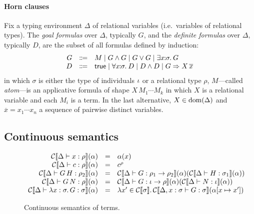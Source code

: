 \paragraph{Horn clauses}
Fix a typing environment $\Delta$ of relational variables (i.e.~variables of relational types). 
The \emph{goal formulas} over $\Delta$, typically $G$, and the \emph{definite formulas} over $\Delta$, typically $D$, are the subset of all formulas defined by induction:
\[
  \begin{array}{rcl}
    G & \Coloneqq & M \mid G \wedge G \mid G \vee G \mid \exists x\!\!:\!\!\sigma.\: G  \\
    D & \Coloneqq & \truetm \mid \forall x\!\!:\!\!\sigma.\: D \mid D \wedge D \mid G \Rightarrow X \, \overline x \\
  \end{array}
\]
in which $\sigma$ is either the type of individuals $\iota$ or a relational type $\rho$, $M$---called \emph{atom}---is an applicative formula of shape ${X \, M_1 \cdots M_k}$
in which $X$ is a relational variable and each $M_i$ is a term.
In the last alternative, $X \in \mathrm{dom}(\Delta)$ and $\overline{x} = x_1 \cdots x_n$ a sequence of pairwise distinct variables.

\subsection{Continuous semantics}

\begin{figure*}
\[
  \begin{array}{rcl}
    \cmng{\Delta \vdash x : \rho}(\alpha) &=& \alpha(x) \\
    \cmng{\Delta \vdash c : \rho}(\alpha) &=& c^\rho \\
    \cmng{\Delta \vdash {G \, H} : \rho_2}(\alpha) &=& \cmng{\Delta \vdash G : \rho_1 \to \rho_2}(\alpha)(\cmng{\Delta \vdash H : \sigma_1}(\alpha)) \\
    \cmng{\Delta \vdash {G \, N} : \rho}(\alpha) &=& \cmng{\Delta \vdash G : \iota \to \rho}(\alpha)(\cmng{\Delta \vdash N : \iota}(\alpha)) \\
    \cmng{\Delta \vdash \abs{x:\sigma}{G} : \sigma}(\alpha) &=& %
    \abs{x' \in \cmng{\sigma}}{\cmng{\Delta, x:\sigma \vdash G : \sigma}(\alpha[x \mapsto x'])}
  \end{array}
\]
\caption{Continuous semantics of terms.}\label{fig:cts-term-semantics}
\end{figure*}

